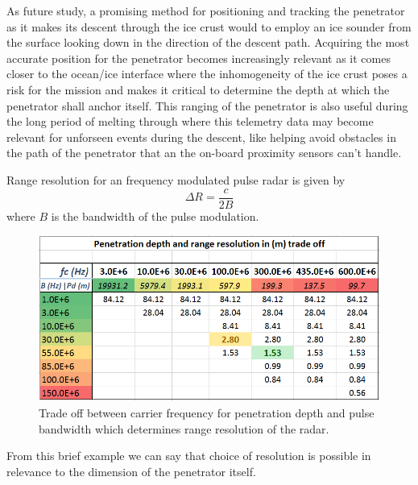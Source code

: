 
As future study, a promising method for positioning and tracking the penetrator as it makes its descent through the ice crust would to employ an ice sounder from the surface looking down in the direction of the descent path. Acquiring  the most accurate position for the penetrator becomes increasingly relevant as it comes closer to the ocean/ice interface where the inhomogeneity of the ice crust poses a risk for the mission and makes it critical to determine the depth at which the penetrator shall anchor itself. This ranging of the penetrator is also useful during the long period of melting through where this telemetry data may become relevant for unforseen events during the descent, like helping avoid obstacles in the path of the penetrator that an the on-board proximity sensors can't handle. 


Range resolution for an frequency modulated pulse radar is given by
\begin{equation}
    \Delta R = \frac{c}{2B}
\end{equation}
where $B$ is the bandwidth of the pulse modulation.

\begin{figure}[htb]
	\centering
	\includegraphics[width=.66\textwidth]{figures/iRadar/iceRadar-res-trade}
	\caption{Trade off between carrier frequency for penetration depth and pulse bandwidth which determines range resolution of the radar.}
	\label{fig:iceRadar-res-trade}
\end{figure}

From this brief example we can say that choice of resolution is possible in relevance to the dimension of the penetrator itself.